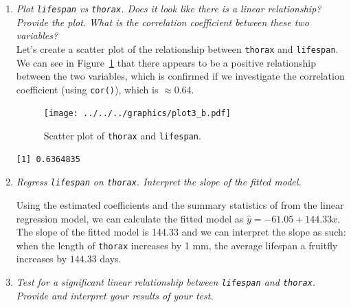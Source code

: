 \documentclass[12pt,letterpaper]{article}
\begin{document}
\begin{enumerate}[label=(\alph*)]
	\item	\emph{Plot \texttt{lifespan} vs \texttt{thorax}. Does it look like there is a linear relationship? Provide the plot. What is the correlation coefficient between these two variables?}\\
	
	 \vspace{.15cm}
	Let's create a scatter plot of the relationship between \texttt{thorax} and \texttt{lifespan}. We can see in Figure~\ref{fig:plot3_b} that there appears to be a positive relationship between the two variables, which is confirmed if we investigate the correlation coefficient (using \texttt{cor()}), which is $\approx 0.64$.
 \vspace{.15cm}
  
	
\begin{figure}[h!]\centering
	\caption{\footnotesize Scatter plot of \texttt{thorax} and \texttt{lifespan}.
	}\vspace{-1cm}
	\label{fig:plot3_b}
	\texttt{[image: ../../../graphics/plot3\_b.pdf]}\\
\end{figure}

\vspace{.25cm}

  

		\begin{verbatim}
[1] 0.6364835
		\end{verbatim}

	\item	\emph{Regress \texttt{lifespan} on \texttt{thorax}.  Interpret the slope of the fitted model.}\\
	\vspace{.15cm}
	
	  
		\vspace{.25cm}


Using the estimated coefficients and the summary statistics of from the linear regression model, we can calculate the fitted model as $\hat{y} = -61.05 + 144.33x$. The slope of the fitted model is 144.33 and we can interpret the slope as such: when the length of \texttt{thorax} increases by 1 mm, the average lifespan a fruitfly increases by $144.33$ days.

	\item	\emph{Test for a significant linear relationship between  \texttt{lifespan} and \texttt{thorax}. Provide and interpret your results of your test.}
	

\end{enumerate}
\end{document}
